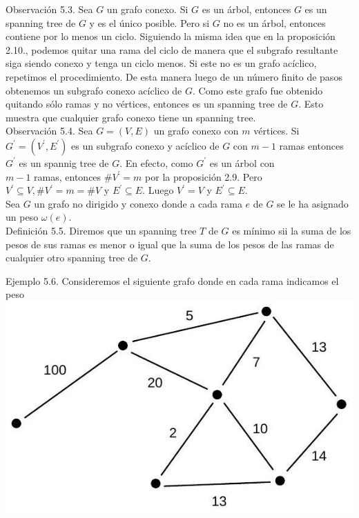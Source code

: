 \documentclass[10pt]{article}
\begin{document}
Observación 5.3. Sea $G$ un grafo conexo. Si $G$ es un árbol, entonces $G$ es un spanning tree de $G$ y es el único posible. Pero si $G$ no es un árbol, entonces contiene por lo menos un ciclo. Siguiendo la misma idea que en la proposición 2.10., podemos quitar una rama del ciclo de manera que el subgrafo resultante siga siendo conexo y tenga un ciclo menos. Si este no es un grafo acíclico, repetimos el procedimiento. De esta manera luego de un número finito de pasos obtenemos un subgrafo conexo acíclico de $G$. Como este grafo fue obtenido quitando sólo ramas y no vértices, entonces es un spanning tree de $G$. Esto muestra que cualquier grafo conexo tiene un spanning tree.\\
Observación 5.4. Sea $G=(V, E)$ un grafo conexo con $m$ vértices. Si $G^{\prime}=\left(V^{\prime}, E^{\prime}\right)$ es un subgrafo conexo y acíclico de $G$ con $m-1$ ramas entonces $G^{\prime}$ es un spannig tree de $G$. En efecto, como $G^{\prime}$ es un árbol con\\
$m-1$ ramas, entonces $\# V^{\prime}=m$ por la proposición 2.9. Pero $V^{\prime} \subseteq V, \# V^{\prime}=m=\# V$ y $E^{\prime} \subseteq E$. Luego $V^{\prime}=V$ y $E^{\prime} \subseteq E$.\\
Sea $G$ un grafo no dirigido y conexo donde a cada rama $e$ de $G$ se le ha asignado un peso $\omega(e)$.\\
Definición 5.5. Diremos que un spanning tree $T$ de $G$ es mínimo sii la suma de los pesos de sus ramas es menor o igual que la suma de los pesos de las ramas de cualquier otro spanning tree de $G$.

Ejemplo 5.6. Consideremos el siguiente grafo donde en cada rama indicamos el peso\\
\includegraphics[max width=\textwidth, center]{2025_09_05_93c7c1835f249f70c0eeg-14(1)}
\end{document}
